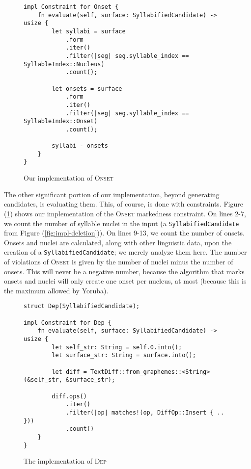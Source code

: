 \documentclass[12pt]{article}
\newcommand{\dep}{\textsc{Dep}}
\newcommand{\onset}{\textsc{Onset}}
\newcommand{\pref}[1]{(\ref{#1})}
\begin{document}
\begin{figure}[h!]
\caption{Our implementation of \onset}
\label{fig:impl-onset}
\begin{verbatim}
impl Constraint for Onset {
    fn evaluate(self, surface: SyllabifiedCandidate) -> usize {
        let syllabi = surface
            .form
            .iter()
            .filter(|seg| seg.syllable_index == SyllableIndex::Nucleus)
            .count();

        let onsets = surface
            .form
            .iter()
            .filter(|seg| seg.syllable_index == SyllableIndex::Onset)
            .count();

        syllabi - onsets
    }
}
\end{verbatim}
\end{figure}

The other significant portion of our implementation, beyond generating
candidates, is evaluating them. This, of course, is done with constraints.
Figure \pref{fig:impl-onset} shows our implementation of the \onset{}
markedness constraint. On lines 2-7, we count the number of syllable nuclei in
the input (a \texttt{SyllabifiedCandidate} from Figure
\pref{fig:impl-deletion}). On lines 9-13, we count the number of onsets. Onsets
and nuclei are calculated, along with other linguistic data, upon the creation
of a \texttt{SyllabifiedCandidate}; we merely analyze them here. The number of
violations of \onset{} is given by the number of nuclei minus the number of
onsets. This will never be a negative number, because the algorithm that marks
onsets and nuclei will only create one onset per nucleus, at most (because this
is the maximum allowed by Yoruba).

\begin{figure}[h]
\caption{The implementation of \dep}
\label{fig:impl-dep}
\begin{verbatim}
struct Dep(SyllabifiedCandidate);

impl Constraint for Dep {
    fn evaluate(self, surface: SyllabifiedCandidate) -> usize {
        let self_str: String = self.0.into();
        let surface_str: String = surface.into();

        let diff = TextDiff::from_graphemes::<String>(&self_str, &surface_str);

        diff.ops()
            .iter()
            .filter(|op| matches!(op, DiffOp::Insert { .. }))
            .count()
    }
}
\end{verbatim}
\end{figure}
\end{document}
